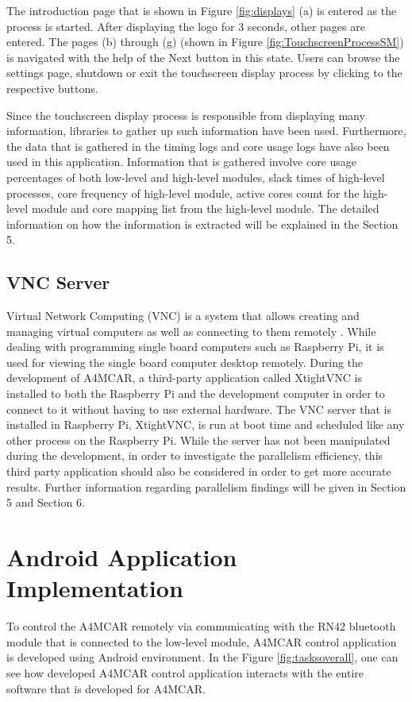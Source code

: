 The introduction page that is shown in Figure \ref{fig:displays} (a) is entered as the process is started. After displaying the logo for 3 seconds, other pages are entered. The pages (b) through (g) (shown in Figure \ref{fig:TouchscreenProcessSM}) is navigated with the help of the Next button in this state. Users can browse the settings page, shutdown or exit the touchscreen display process by clicking to the respective buttons.

Since the touchscreen display process is responsible from displaying many information, libraries to gather up such information have been used. Furthermore, the data that is gathered in the timing logs and core usage logs have also been used in this application. Information that is gathered involve core usage percentages of both low-level and high-level modules, slack times of high-level processes, core frequency of high-level module, active cores count for the high-level module and core mapping list from the high-level module. The detailed information on how the information is extracted will be explained in the Section 5.

\subsection{VNC Server}
Virtual Network Computing (VNC) is a system that allows creating and managing virtual computers as well as connecting to them remotely \cite{vncmagazine}. While dealing with programming single board computers such as Raspberry Pi, it is used for viewing the single board computer desktop remotely. During the development of A4MCAR, a third-party application called XtightVNC is installed to both the Raspberry Pi and the development computer in order to connect to it without having to use external hardware.  The VNC server that is installed in Raspberry Pi, XtightVNC, is run at boot time and scheduled like any other process on the Raspberry Pi. While the server has not been manipulated during the development, in order to investigate the parallelism efficiency, this third party application should also be considered in order to get more accurate results. Further information regarding parallelism findings will be given in Section 5 and Section 6. 

\section{Android Application Implementation}
To control the A4MCAR remotely via communicating with the RN42 bluetooth module that is connected to the low-level module, A4MCAR control application is developed using Android \cite{androidwebsite} environment. In the Figure \ref{fig:tasksoverall}, one can see how developed A4MCAR control application interacts with the entire software that is developed for A4MCAR. 

